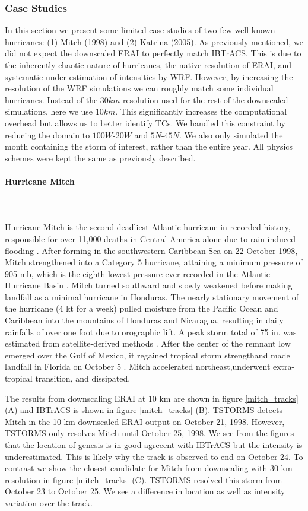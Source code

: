 \documentclass[smallextended]{svjour3}       %
\newcommand{\myparagraph}[1]{\paragraph{#1}\mbox{}\\\mbox{}\\}
\begin{document}
\subsubsection{Case Studies}
\label{cases}
In this section we present some limited case studies of two few well known hurricanes: (1) Mitch (1998) and (2) Katrina (2005). As previously mentioned, we did not expect the downscaled ERAI to perfectly match IBTrACS. This is due to the inherently chaotic nature of hurricanes, the native resolution of ERAI, and systematic under-estimation of intensities by WRF. However, by increasing the resolution of the WRF simulations we can roughly match some individual hurricanes. Instead of the $30 km$ resolution used for the rest of the downscaled simulations, here we use $10 km$. This significantly increases the computational overhead but allows us to better identify TCs. We handled this constraint by reducing the domain to $100 W$-$20 W$ and $5 N$-$45 N$. We also only simulated the month containing the storm of interest, rather than the entire year. All physics schemes were kept the same as previously described. 

\myparagraph{Hurricane Mitch}
Hurricane Mitch is the second deadliest Atlantic hurricane in recorded history, responsible for over 11,000 deaths in Central America alone due to rain-induced flooding \cite{hellin}.  After forming in the southwestern Caribbean Sea on 22 October 1998, Mitch strengthened into a Category 5 hurricane, attaining a minimum pressure of 905 mb, which is the eighth lowest pressure ever recorded in the Atlantic Hurricane Basin \cite{pasch}.  Mitch turned southward and slowly weakened before making landfall as a minimal hurricane in Honduras.  The nearly stationary movement of the hurricane (4 kt for a week) pulled moisture from the Pacific Ocean and Caribbean into the mountains of Honduras and Nicaragua, resulting in daily rainfalls of over one foot due to orographic lift.  A peak storm total of 75 in. was estimated from satellite-derived methods \cite{hellin}.  After the center of the remnant low emerged over the Gulf of Mexico, it regained tropical storm strengthand made landfall in Florida on October 5 \cite{pasch}.  Mitch accelerated northeast,underwent extra-tropical transition, and dissipated.
\par
The results from downscaling ERAI at 10 km are shown in figure \ref{mitch_tracks} (A) and IBTrACS is shown in figure \ref{mitch_tracks} (B). TSTORMS detects Mitch in the 10 km downscaled ERAI output on October 21, 1998. However, TSTORMS only resolves Mitch until October 25, 1998. We see from the figures that the location of genesis is in good agreeent with IBTrACS but the intensity is underestimated. This is likely why the track is observed to end on October 24. To contrast we show the closest candidate for Mitch from downscaling with 30 km resolution in figure \ref{mitch_tracks} (C). TSTORMS resolved this storm from October 23 to October 25. We see a difference in location as well as intensity variation over the track.  
\end{document}
